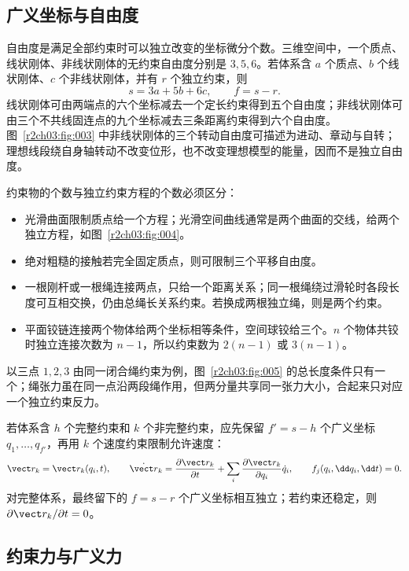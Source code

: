 \subsection{广义坐标与自由度}

自由度是满足全部约束时可以独立改变的坐标微分个数。三维空间中，一个质点、线状刚体、非线状刚体的无约束自由度分别是 $3,5,6$。若体系含 $a$ 个质点、$b$ 个线状刚体、$c$ 个非线状刚体，并有 $r$ 个独立约束，则
\begin{equation}
 s=3a+5b+6c,\qquad f=s-r .
 \label{r2ch03:eq:004}
\end{equation}
线状刚体可由两端点的六个坐标减去一个定长约束得到五个自由度；非线状刚体可由三个不共线固连点的九个坐标减去三条距离约束得到六个自由度。图~\ref{r2ch03:fig:003} 中非线状刚体的三个转动自由度可描述为进动、章动与自转；理想线段绕自身轴转动不改变位形，也不改变理想模型的能量，因而不是独立自由度。
\figRigidEulerAngles

约束物的个数与独立约束方程的个数必须区分：
\begin{itemize}
 \item 光滑曲面限制质点给一个方程；光滑空间曲线通常是两个曲面的交线，给两个独立方程，如图~\ref{r2ch03:fig:004}。
 \item 绝对粗糙的接触若完全固定质点，则可限制三个平移自由度。
 \item 一根刚杆或一根绳连接两点，只给一个距离关系；同一根绳绕过滑轮时各段长度可互相交换，仍由总绳长关系约束。若换成两根独立绳，则是两个约束。
 \item 平面铰链连接两个物体给两个坐标相等条件，空间球铰给三个。$n$ 个物体共铰时独立连接次数为 $n-1$，所以约束数为 $2(n-1)$ 或 $3(n-1)$。
\end{itemize}
\figSurfaceCurveConstraint

以三点 $1,2,3$ 由同一闭合绳约束为例，图~\ref{r2ch03:fig:005} 的总长度条件只有一个；绳张力虽在同一点沿两段绳作用，但两分量共享同一张力大小，合起来只对应一个独立约束反力。
\figThreeBodyOneRope

若体系含 $h$ 个完整约束和 $k$ 个非完整约束，应先保留 $f'=s-h$ 个广义坐标 $q_1,\ldots,q_{f'}$，再用 $k$ 个速度约束限制允许速度：
\begin{equation}
 \vect r_k=\vect r_k(q_i,t),\qquad
 \dot{\vect r}_k=\frac{\partial\vect r_k}{\partial t}
 +\sum_i\frac{\partial\vect r_k}{\partial q_i}\dot q_i,\qquad
 f_j(q_i,\dd q_i,\dd t)=0 .
 \label{r2ch03:eq:005}
\end{equation}
对完整体系，最终留下的 $f=s-r$ 个广义坐标相互独立；若约束还稳定，则 $\partial\vect r_k/\partial t=0$。

\subsection{约束力与广义力}

